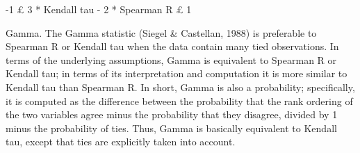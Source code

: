-1 £ 3 * Kendall tau - 2 * Spearman R £ 1

Gamma. The Gamma statistic (Siegel & Castellan, 1988) is preferable to Spearman R or Kendall tau when the data contain many tied observations. In terms of the underlying assumptions, Gamma is equivalent to Spearman R or Kendall tau; in terms of its interpretation and computation it is more similar to Kendall tau than Spearman R. In short, Gamma is also a probability; specifically, it is computed as the difference between the probability that the rank ordering of the two variables agree minus the probability that they disagree, divided by 1 minus the probability of ties. Thus, Gamma is basically equivalent to Kendall tau, except that ties are explicitly taken into account.
